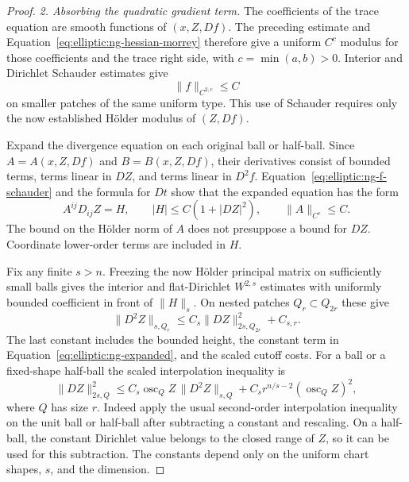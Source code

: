 \begin{proof}
\medskip\noindent\emph{2. Absorbing the quadratic gradient term.}
The coefficients of the trace equation are smooth functions of
$(x,Z,Df)$.  The preceding estimate and Equation~\eqref{eq:elliptic:ng-hessian-morrey}
therefore give a uniform $C^c$ modulus for those coefficients and
the trace right side, with $c=\min(a,b)>0$.  Interior and Dirichlet
Schauder estimates give
\begin{equation}\label{eq:elliptic:ng-f-schauder}
 \|f\|_{C^{2,c}}\le C
\end{equation}
on smaller patches of the same uniform type.  This use of Schauder
requires only the now established H\"older modulus of $(Z,Df)$.

Expand the divergence equation on each original ball or half-ball.
Since $A=A(x,Z,Df)$ and $B=B(x,Z,Df)$, their derivatives consist of
bounded terms, terms linear in $DZ$, and terms linear in $D^2f$.
Equation~\eqref{eq:elliptic:ng-f-schauder} and the formula for $Dt$ show that
the expanded equation has the form
\begin{equation}\label{eq:elliptic:ng-expanded}
 A^{ij}D_{ij}Z=H,
 \qquad |H|\le C(1+|DZ|^2),
 \qquad \|A\|_{C^c}\le C.
\end{equation}
The bound on the H\"older norm of $A$ does not presuppose a bound for
$DZ$.  Coordinate lower-order terms are included in $H$.

Fix any finite $s>n$.  Freezing the now H\"older principal matrix
on sufficiently small balls gives the interior and flat-Dirichlet
$W^{2,s}$ estimates with uniformly bounded coefficient in front of
$\|H\|_s$.  On nested patches $Q_r\subset Q_{2r}$ these give
\begin{equation}\label{eq:elliptic:ng-local-w2s}
 \|D^2Z\|_{s,Q_r}
 \le C_s\|DZ\|_{2s,Q_{2r}}^2+C_{s,r}.
\end{equation}
The last constant includes the bounded height, the constant term
in Equation~\eqref{eq:elliptic:ng-expanded}, and the scaled cutoff costs.
For a ball or a fixed-shape half-ball the scaled interpolation
inequality is
\begin{equation}\label{eq:elliptic:ng-interpolation}
 \|DZ\|_{2s,Q}^2
 \le C_s\operatorname{osc}_Q Z\,\|D^2Z\|_{s,Q}
   +C_s r^{n/s-2}(\operatorname{osc}_Q Z)^2,
\end{equation}
where $Q$ has size $r$.  Indeed apply the usual second-order
interpolation inequality on the unit ball or half-ball after
subtracting a constant and rescaling.  On a half-ball, the constant
Dirichlet value belongs to the closed range of $Z$, so it can be
used for this subtraction.  The constants depend only on the
uniform chart shapes, $s$, and the dimension.


\end{proof}
